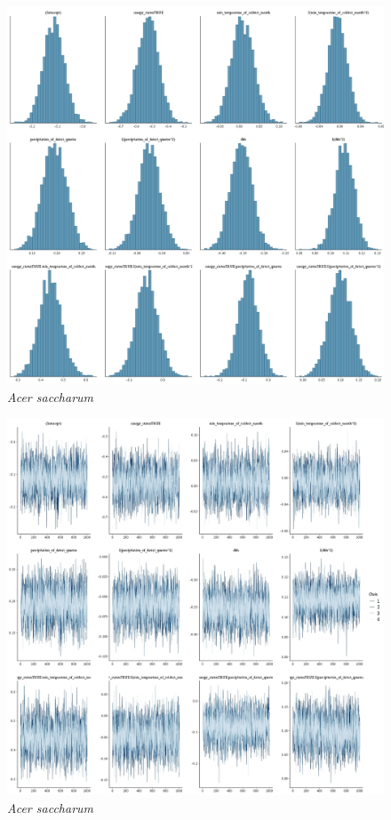 \documentclass[letterpaper, 12pt]{article}
\begin{document}
\begin{figure}
	\centering
	\includegraphics[scale=0.4]{./28731-ACE-SAC_hist}
	\caption{\textit{Acer saccharum}}
\end{figure}

\begin{figure}
	\centering
	\includegraphics[scale=0.4]{./28731-ACE-SAC_traces}
	\caption{\textit{Acer saccharum}}
\end{figure}
\end{document}
